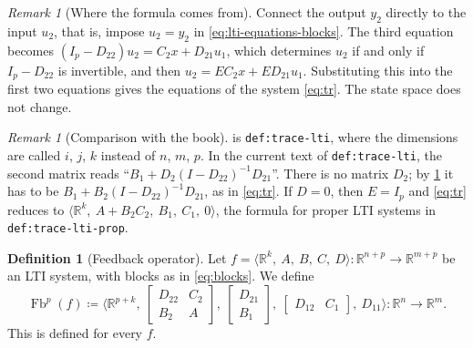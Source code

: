 \documentclass[11pt,a4paper]{article}
\theoremstyle{plain}
\theoremstyle{definition}
\newtheorem{definition}[theorem]{Definition}
\theoremstyle{remark}
\newtheorem{remark}[theorem]{Remark}
\DeclareMathOperator{\Fb}{Fb}
\newcommand{\R}{\mathbb{R}}
\newcommand{\sys}[5]{\bigl\langle #1,\ #2,\ #3,\ #4,\ #5 \bigr\rangle}
\newcommand{\lbl}[1]{\nolinkurl{#1}}
\begin{document}
\begin{remark}[Where the formula comes from]
    \label{rem:tr-origin}
    Connect the output $y_2$ directly to the input $u_2$, that is, impose $u_2 = y_2$ in \cref{eq:lti-equations-blocks}.
    The third equation becomes $(I_p - D_{22}) u_2 = C_2 x + D_{21} u_1$, which determines $u_2$ if and only if $I_p - D_{22}$ is invertible, and then $u_2 = E C_2 x + E D_{21} u_1$.
    Substituting this into the first two equations gives the equations of the system \cref{eq:tr}.
    The state space does not change.
\end{remark}

\begin{remark}[Comparison with the book]
    \label{rem:misprint}
     is \lbl{def:trace-lti}, where the dimensions are called $i$, $j$, $k$ instead of $n$, $m$, $p$.
    In the current text of \lbl{def:trace-lti}, the second matrix reads ``$B_1 + D_2(I - D_{22})^{-1} D_{21}$''.
    There is no matrix $D_2$; by \cref{rem:tr-origin} it has to be $B_1 + B_2 (I - D_{22})^{-1} D_{21}$, as in \cref{eq:tr}.
    If $D = 0$, then $E = I_p$ and \cref{eq:tr} reduces to $\sys{\R^k}{A + B_2 C_2}{B_1}{C_1}{0}$, the formula for proper LTI systems in \lbl{def:trace-lti-prop}.
\end{remark}

\begin{definition}[Feedback operator]
    \label{def:fb}
    Let $f = \sys{\R^k}{A}{B}{C}{D} \colon \R^{n+p} \to \R^{m+p}$ be an LTI system, with blocks as in \cref{eq:blocks}.
    We define
    \begin{equation}
        \label{eq:fb}
        \Fb^p(f) \coloneqq \sys{\R^{p+k}}
        {\begin{bmatrix} D_{22} & C_2 \\ B_2 & A \end{bmatrix}}
        {\begin{bmatrix} D_{21} \\ B_1 \end{bmatrix}}
        {\begin{bmatrix} D_{12} & C_1 \end{bmatrix}}
        {D_{11}}
        \colon \R^n \to \R^m .
    \end{equation}
    This is defined for every $f$.
\end{definition}
\end{document}
